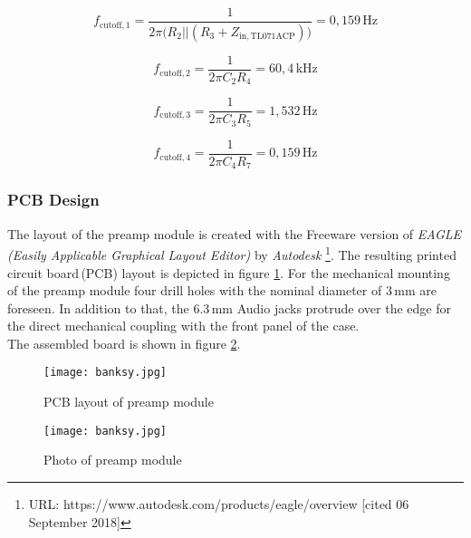 \begin{equation}
f_{\mathrm{cutoff},1} = \frac{1}{2\pi \Big( R_2 || (R_3 + Z_{\mathrm{in,TL071ACP}})\Big)} = 0,159\,\mathrm{Hz}
\label{eq:fc1}
\end{equation}

\begin{equation}
f_{\mathrm{cutoff},2} = \frac{1}{2\pi C_2 R_4} = 60,4\,\mathrm{kHz}
\label{eq:fc2}
\end{equation}

\begin{equation}
f_{\mathrm{cutoff},3} = \frac{1}{2\pi C_3 R_5} = 1,532\,\mathrm{Hz}
\label{eq:fc2}
\end{equation}

\begin{equation}
f_{\mathrm{cutoff},4} = \frac{1}{2\pi C_4 R_7} = 0,159\,\mathrm{Hz}
\label{eq:fc2}
\end{equation}


\subsubsection{PCB Design}

The layout of the preamp module is created with the Freeware version of \textit{EAGLE (Easily Applicable Graphical Layout Editor)} by \textit{Autodesk} \footnote{URL: https://www.autodesk.com/products/eagle/overview [cited 06 September 2018]}.
The resulting printed circuit board\,(PCB) layout is depicted in figure \ref{fig:Preamp_PCB}.
For the mechanical mounting of the preamp module four drill holes with the nominal diameter of 3\,mm are foreseen. In addition to that, the 6.3\,mm Audio jacks protrude over the edge for the direct mechanical coupling with the front panel of the case.\\
The assembled board is shown in figure \ref{fig:Preamp_Photo}.



\begin{figure}[H]
	\centering \texttt{[image: banksy.jpg]}
	\caption[Preamp_PCB]{PCB layout of preamp module}
	\label{fig:Preamp_PCB}
\end{figure}


\begin{figure}[H]
	\centering \texttt{[image: banksy.jpg]}
	\caption[Preamp_Photo]{Photo of preamp module}
	\label{fig:Preamp_Photo}
\end{figure}
\newpage
